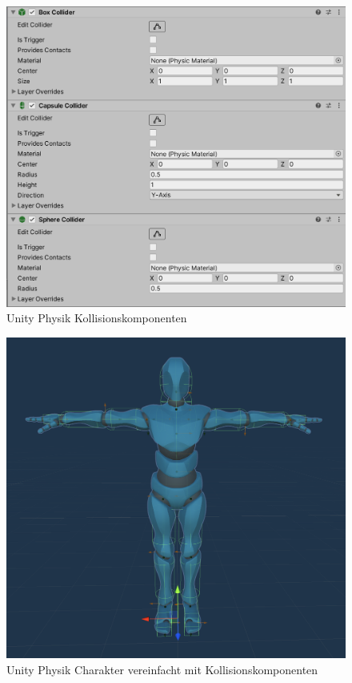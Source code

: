  \begin{figure}[H]
  \centering  
  \includegraphics[scale=0.5]{img/komponente_collider}
  \caption{Unity Physik Kollisionskomponenten}
  \label{fig:komponente_collider}
\end{figure}

 \begin{figure}[H]
  \centering  
  \includegraphics[scale=0.4]{img/charakter_mixamo_collider}
  \caption{Unity Physik Charakter vereinfacht mit Kollisionskomponenten }
  \label{fig:charakter_mixamo_collider}
\end{figure}

